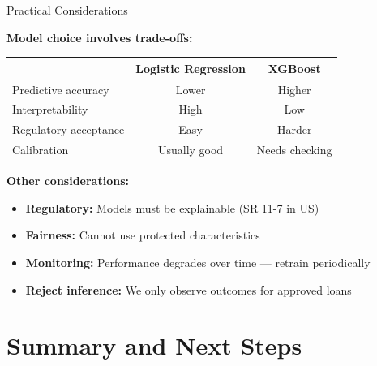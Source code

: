 \documentclass[10pt]{beamer}
\begin{document}
\begin{frame}{Practical Considerations}

  \textbf{Model choice involves trade-offs:}

  \vspace{0.5em}
  \begin{center}
  \begin{tabular}{lcc}
    \toprule
    & \textbf{Logistic Regression} & \textbf{XGBoost} \\
    \midrule
    Predictive accuracy & Lower & Higher \\
    Interpretability & High & Low \\
    Regulatory acceptance & Easy & Harder \\
    Calibration & Usually good & Needs checking \\
    \bottomrule
  \end{tabular}
  \end{center}

  \vspace{0.5em}
  \textbf{Other considerations:}
  \begin{itemize}
    \item \textbf{Regulatory:} Models must be explainable (SR 11-7 in US)
    \item \textbf{Fairness:} Cannot use protected characteristics
    \item \textbf{Monitoring:} Performance degrades over time --- retrain periodically
    \item \textbf{Reject inference:} We only observe outcomes for approved loans
  \end{itemize}
\end{frame}

\section{Summary and Next Steps}
\end{document}
